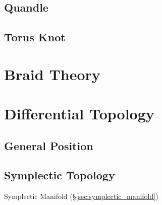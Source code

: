 \subsection{Quandle} \label{sec:quandle}

\subsection{Torus Knot} \label{sec:torus_knot}



\section{Braid Theory} \label{sec:braid_theory}

\section{Differential Topology}\label{sec:differential_topology}

\subsection{General Position}\label{sec:general_position}

\subsection{Symplectic Topology}\label{sec:symplectic_topology}

Symplectic Manifold (\S\ref{sec:symplectic_manifold})



